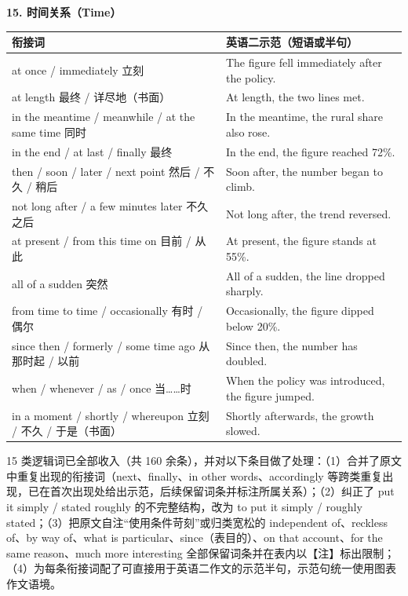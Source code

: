 \documentclass[11pt,a4paper]{ctexart}
\newcommand{\impr}[1]{\par\addvspace{3pt}\noindent{\bfseries【本次改进】}#1\par\addvspace{3pt}}
\begin{document}
\par\addvspace{6pt}\noindent\textbf{15. 时间关系（Time）}\par\addvspace{2pt}
\begin{longtable}{L{5.4cm}L{10.6cm}}
\toprule
\textbf{衔接词} & \textbf{英语二示范（短语或半句）} \\
\midrule
\endhead
at once / immediately 立刻 & The figure fell immediately after the policy. \\
at length 最终 / 详尽地（书面） & At length, the two lines met. \\
in the meantime / meanwhile / at the same time 同时 & In the meantime, the rural share also rose. \\
in the end / at last / finally 最终 & In the end, the figure reached 72\%. \\
then / soon / later / next point 然后 / 不久 / 稍后 & Soon after, the number began to climb. \\
not long after / a few minutes later 不久之后 & Not long after, the trend reversed. \\
at present / from this time on 目前 / 从此 & At present, the figure stands at 55\%. \\
all of a sudden 突然 & All of a sudden, the line dropped sharply. \\
from time to time / occasionally 有时 / 偶尔 & Occasionally, the figure dipped below 20\%. \\
since then / formerly / some time ago 从那时起 / 以前 & Since then, the number has doubled. \\
when / whenever / as / once 当……时 & When the policy was introduced, the figure jumped. \\
in a moment / shortly / whereupon 立刻 / 不久 / 于是（书面） & Shortly afterwards, the growth slowed. \\
\bottomrule
\end{longtable}

\impr{15 类逻辑词已全部收入（共 160 余条），并对以下条目做了处理：（1）合并了原文中重复出现的衔接词（next、finally、in other words、accordingly 等跨类重复出现，已在首次出现处给出示范，后续保留词条并标注所属关系）；（2）纠正了 put it simply / stated roughly 的不完整结构，改为 to put it simply / roughly stated；（3）把原文自注“使用条件苛刻”或归类宽松的 independent of、reckless of、by way of、what is particular、since（表目的）、on that account、for the same reason、much more interesting 全部保留词条并在表内以【注】标出限制；（4）为每条衔接词配了可直接用于英语二作文的示范半句，示范句统一使用图表作文语境。}
\end{document}

